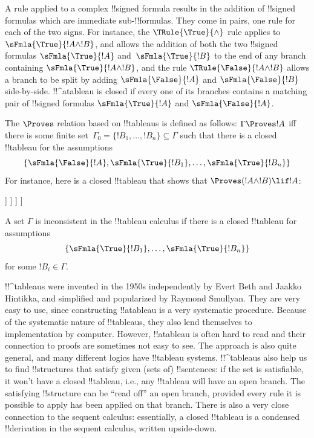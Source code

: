 A rule applied to a complex !!{signed formula} results in the addition
of !!{signed formula}s which are immediate sub-!!{formula}s. They come
in pairs, one rule for each of the two signs.  For instance, the
$\TRule{\True}{\land}$ rule applies to $\sFmla{\True}{!A \land !B}$,
and allows the addition of both the two !!{signed formula}s
$\sFmla{\True}{!A}$ and~$\sFmla{\True}{!B}$ to the end of any branch
containing $\sFmla{\True}{!A \land !B}$, and the rule
$\TRule{\False}{!A \land !B}$ allows a branch to be split by adding
$\sFmla{\False}{!A}$ and $\sFmla{\False}{!B}$ side-by-side.
!!^a{tableau} is closed if every one of its branches contains a
matching pair of !!{signed formula}s $\sFmla{\True}{!A}$ and
$\sFmla{\False}{!A}$.

The $\Proves$ relation based on !!{tableau}s is defined as follows:
$\Gamma \Proves !A$ iff there is some finite set~$\Gamma_0 = \{!B_1,
\dots, !B_n\} \subseteq \Gamma$ such that there is a closed !!{tableau}
for the assumptions
\[
\{\sFmla{\False}{!A}, \sFmla{\True}{!B_1}, \dots, \sFmla{\True}{!B_n}\} 
\]
For instance, here is a closed !!{tableau} that shows that $\Proves
(!A \land !B) \lif !A$:
\begin{oltableau}
  [\sFmla{\False}{(\formula{A} \land \formula{B}) \lif \formula{A}}, just = \TAss
    [\sFmla{\True}{\formula{A} \land \formula{B}}, just = {\TRule{\False}{\lif}[1]}
      [\sFmla{\False}{\formula{A}}, just = {\TRule{\False}{\lif}[1]}
        [\sFmla{\True}{\formula{A}}, just = {\TRule{\True}{\lif}[2]}
          [\sFmla{\True}{\formula{B}}, just = {\TRule{\True}{\lif}[2]}, close]
        ]
      ]
    ]
  ]
\end{oltableau}

A set $\Gamma$ is inconsistent in the !!{tableau} calculus if there is
a closed !!{tableau} for assumptions
\[
\{\sFmla{\True}{!B_1}, \dots, \sFmla{\True}{!B_n}\} 
\]
for some $!B_i \in \Gamma$.

!!^{tableau}s were invented in the 1950s independently by Evert
Beth and Jaakko Hintikka, and simplified and popularized by Raymond
Smullyan. They are very easy to use, since constructing !!a{tableau} is a
very systematic procedure. Because of the systematic nature of
!!{tableau}s, they also lend themselves to implementation by
computer. However, !!a{tableau} is often hard to read and their
connection to proofs are sometimes not easy to see. The approach is
also quite general, and many different logics have !!{tableau}
systems. !!^{tableau}s also help us to find !!{structure}s that
satisfy given (sets of) !!{sentence}s: if the set is satisfiable, it
won't have a closed !!{tableau}, i.e., any !!{tableau} will have an
open branch. The satisfying !!{structure} can be ``read off'' an open
branch, provided every rule it is possible to apply has been applied
on that branch.  There is also a very close connection to the sequent
calculus: essentially, a closed !!{tableau} is a condensed
!!{derivation} in the sequent calculus, written upside-down.





